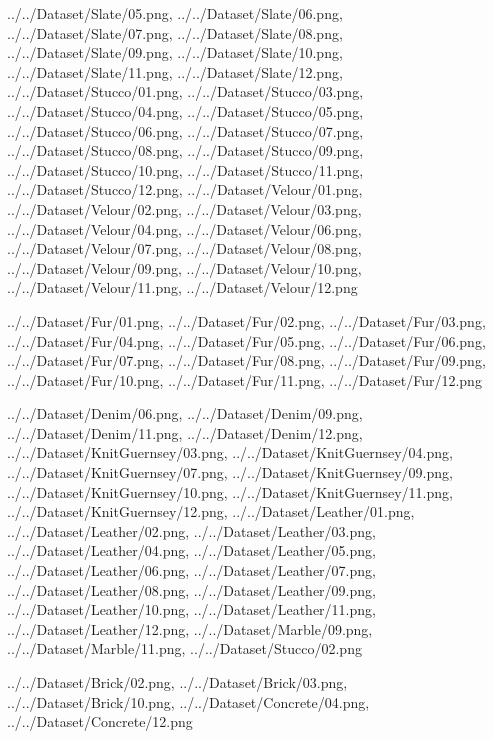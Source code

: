 \documentclass[12pt,a4paper]{article}
\begin{document}
\begin{singlespace}
{../../Dataset/Slate/05.png,
../../Dataset/Slate/06.png,
../../Dataset/Slate/07.png,
../../Dataset/Slate/08.png,
../../Dataset/Slate/09.png,
../../Dataset/Slate/10.png,
../../Dataset/Slate/11.png,
../../Dataset/Slate/12.png,
../../Dataset/Stucco/01.png,
../../Dataset/Stucco/03.png,
../../Dataset/Stucco/04.png,
../../Dataset/Stucco/05.png,
../../Dataset/Stucco/06.png,
../../Dataset/Stucco/07.png,
../../Dataset/Stucco/08.png,
../../Dataset/Stucco/09.png,
../../Dataset/Stucco/10.png,
../../Dataset/Stucco/11.png,
../../Dataset/Stucco/12.png,
../../Dataset/Velour/01.png,
../../Dataset/Velour/02.png,
../../Dataset/Velour/03.png,
../../Dataset/Velour/04.png,
../../Dataset/Velour/06.png,
../../Dataset/Velour/07.png,
../../Dataset/Velour/08.png,
../../Dataset/Velour/09.png,
../../Dataset/Velour/10.png,
../../Dataset/Velour/11.png,
../../Dataset/Velour/12.png}

{../../Dataset/Fur/01.png,
../../Dataset/Fur/02.png,
../../Dataset/Fur/03.png,
../../Dataset/Fur/04.png,
../../Dataset/Fur/05.png,
../../Dataset/Fur/06.png,
../../Dataset/Fur/07.png,
../../Dataset/Fur/08.png,
../../Dataset/Fur/09.png,
../../Dataset/Fur/10.png,
../../Dataset/Fur/11.png,
../../Dataset/Fur/12.png}

{../../Dataset/Denim/06.png,
../../Dataset/Denim/09.png,
../../Dataset/Denim/11.png,
../../Dataset/Denim/12.png,
../../Dataset/KnitGuernsey/03.png,
../../Dataset/KnitGuernsey/04.png,
../../Dataset/KnitGuernsey/07.png,
../../Dataset/KnitGuernsey/09.png,
../../Dataset/KnitGuernsey/10.png,
../../Dataset/KnitGuernsey/11.png,
../../Dataset/KnitGuernsey/12.png,
../../Dataset/Leather/01.png,
../../Dataset/Leather/02.png,
../../Dataset/Leather/03.png,
../../Dataset/Leather/04.png,
../../Dataset/Leather/05.png,
../../Dataset/Leather/06.png,
../../Dataset/Leather/07.png,
../../Dataset/Leather/08.png,
../../Dataset/Leather/09.png,
../../Dataset/Leather/10.png,
../../Dataset/Leather/11.png,
../../Dataset/Leather/12.png,
../../Dataset/Marble/09.png,
../../Dataset/Marble/11.png,
../../Dataset/Stucco/02.png}

{../../Dataset/Brick/02.png,
../../Dataset/Brick/03.png,
../../Dataset/Brick/10.png,
../../Dataset/Concrete/04.png,
../../Dataset/Concrete/12.png}


\end{singlespace}
\end{document}
